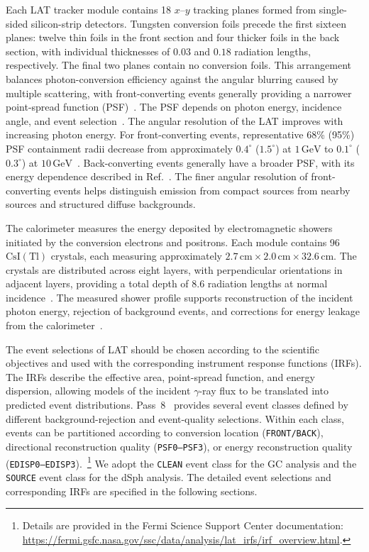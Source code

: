 \documentclass[superscriptaddress,
showpacs,preprintnumbers,nofootinbib,eqsecnum,amsmath,amssymb,aps,11pt, groupedaddress, floatfix]{revtex4-2}
\begin{document}
Each LAT tracker module contains 18 $x$–$y$ tracking planes formed from single-sided silicon-strip detectors. 
Tungsten conversion foils precede the first sixteen planes: twelve thin foils in the front section and four thicker foils in the back section, with individual thicknesses of $0.03$ and $0.18$ radiation lengths, respectively. 
The final two planes contain no conversion foils. This arrangement balances photon-conversion efficiency against the angular blurring caused by multiple scattering, with front-converting events generally providing a narrower point-spread function (PSF)~\cite{Fermi-LAT:2009ihh}. 
The PSF depends on photon energy, incidence angle, and event selection~\cite{Fermi-LAT:2012fsm}.
The angular resolution of the LAT improves with increasing photon energy. For front-converting events, representative 68\% (95\%) PSF containment radii decrease from approximately $0.4^\circ$ ($1.5^\circ$) at $1\,\mathrm{GeV}$ to $0.1^\circ$ ($0.3^\circ$) at $10\,\mathrm{GeV}$~\cite{Fermi-LAT:2015sau}. Back-converting events generally have a broader PSF, with its energy dependence described in Ref.~\cite{Fermi-LAT:2012fsm}. The finer angular resolution of front-converting events helps distinguish emission from compact sources from nearby sources and structured diffuse backgrounds.

The calorimeter measures the energy deposited by electromagnetic showers initiated by the conversion electrons and positrons. 
Each module contains 96 $\mathrm{CsI(Tl)}$ crystals, each measuring approximately $2.7\,\mathrm{cm}\times2.0\,\mathrm{cm}\times32.6\,\mathrm{cm}$. 
The crystals are distributed across eight layers, with perpendicular orientations in adjacent layers, providing a total depth of 8.6 radiation lengths at normal incidence~\cite{Fermi-LAT:2009ihh}. 
The measured shower profile supports reconstruction of the incident photon energy, rejection of background events, and corrections for energy leakage from the calorimeter~\cite{Fermi-LAT:2009ihh,Fermi-LAT:2012fsm}.

The event selections of LAT should be chosen according to the scientific objectives and used with the corresponding instrument response functions (IRFs). The IRFs describe the effective area, point-spread function, and energy dispersion, allowing models of the incident $\gamma$-ray flux to be translated into predicted event distributions. Pass~8~\cite{Fermi-LAT:2013jgq} provides several event classes defined by different background-rejection and event-quality selections. Within each class, events can be partitioned according to conversion location (\texttt{FRONT/BACK}), directional reconstruction quality (\texttt{PSF0--PSF3}), or energy reconstruction quality (\texttt{EDISP0--EDISP3}).~\footnote{Details are provided in the Fermi Science Support Center documentation: \url{https://fermi.gsfc.nasa.gov/ssc/data/analysis/lat_irfs/irf_overview.html}.} We adopt the \texttt{CLEAN} event class for the GC analysis and the \texttt{SOURCE} event class for the dSph analysis. The detailed event selections and corresponding IRFs are specified in the following sections.
\end{document}

